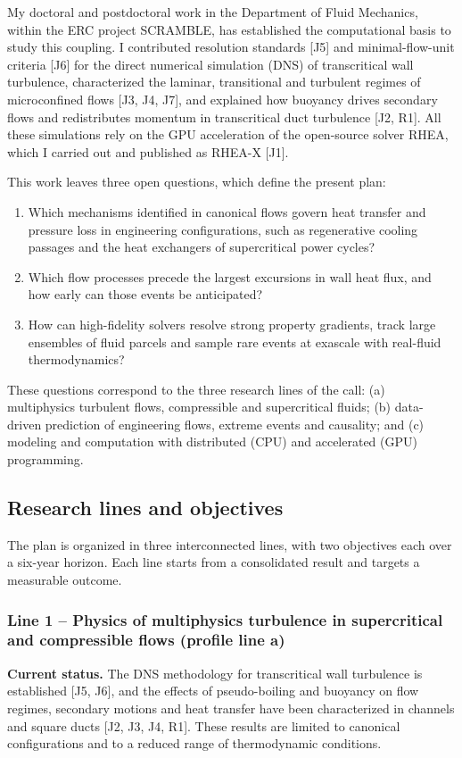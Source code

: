 \documentclass[11pt]{article}
\begin{document}
My doctoral and postdoctoral work in the Department of Fluid Mechanics, within the ERC
project SCRAMBLE, has established the computational basis to study this coupling. I
contributed resolution standards [J5] and minimal-flow-unit criteria [J6] for the direct
numerical simulation (DNS) of transcritical wall turbulence, characterized the laminar,
transitional and turbulent regimes of microconfined flows [J3, J4, J7], and explained how
buoyancy drives secondary flows and redistributes momentum in transcritical duct turbulence
[J2, R1]. All these simulations rely on the GPU acceleration of the open-source solver
RHEA, which I carried out and published as RHEA-X [J1].

This work leaves three open questions, which define the present plan:
\begin{enumerate}[label=(\roman*)]
  \item Which mechanisms identified in canonical flows govern heat transfer and pressure
  loss in engineering configurations, such as regenerative cooling passages and the heat
  exchangers of supercritical power cycles?
  \item Which flow processes precede the largest excursions in wall heat flux, and how
  early can those events be anticipated?
  \item How can high-fidelity solvers resolve strong property gradients, track large
  ensembles of fluid parcels and sample rare events at exascale with real-fluid
  thermodynamics?
\end{enumerate}
These questions correspond to the three research lines of the call: (a) multiphysics
turbulent flows, compressible and supercritical fluids; (b) data-driven prediction of
engineering flows, extreme events and causality; and (c) modeling and computation with
distributed (CPU) and accelerated (GPU) programming.

\subsection{Research lines and objectives}
The plan is organized in three interconnected lines, with two objectives each over a
six-year horizon. Each line starts from a consolidated result and targets a measurable
outcome.

\subsubsection*{Line 1 -- Physics of multiphysics turbulence in supercritical and
compressible flows (profile line a)}
\textbf{Current status.} The DNS methodology for transcritical wall turbulence is
established [J5, J6], and the effects of pseudo-boiling and buoyancy on flow regimes,
secondary motions and heat transfer have been characterized in channels and square ducts
[J2, J3, J4, R1]. These results are limited to canonical configurations and to a reduced
range of thermodynamic conditions.
\end{document}
